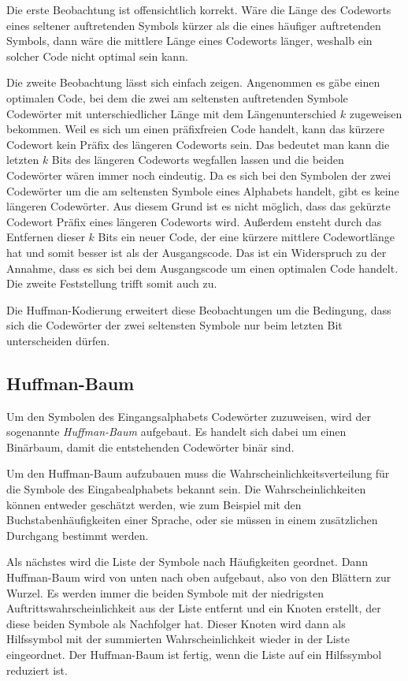 \documentclass[twoside,11pt,a4paper]{article}
\theoremstyle{break}
\begin{document}
Die erste Beobachtung ist offensichtlich korrekt. Wäre die Länge des
Codeworts eines seltener auftretenden Symbols kürzer als die eines
häufiger auftretenden Symbols, dann wäre die mittlere Länge eines
Codeworts länger, weshalb ein solcher Code nicht optimal sein kann.

Die zweite Beobachtung lässt sich einfach zeigen. Angenommen es gäbe
einen optimalen Code, bei dem die zwei am seltensten auftretenden
Symbole Codewörter mit unterschiedlicher Länge mit dem
Längenunterschied $k$ zugeweisen bekommen. Weil es sich um einen
präfixfreien Code handelt, kann das kürzere Codewort kein Präfix des
längeren Codeworts sein. Das bedeutet man kann die letzten $k$ Bits
des längeren Codeworts wegfallen lassen und die beiden Codewörter
wären immer noch eindeutig. Da es sich bei den Symbolen der zwei
Codewörter um die am seltensten Symbole eines Alphabets handelt, gibt
es keine längeren Codewörter. Aus diesem Grund ist es nicht möglich,
dass das gekürzte Codewort Präfix eines längeren Codeworts
wird. Außerdem ensteht durch das Entfernen dieser $k$ Bits ein neuer
Code, der eine kürzere mittlere Codewortlänge hat und somit besser ist
als der Ausgangscode. Das ist ein Widerspruch zu der Annahme, dass es
sich bei dem Ausgangscode um einen optimalen Code handelt. Die zweite
Feststellung trifft somit auch zu.

Die Huffman-Kodierung erweitert diese Beobachtungen um die Bedingung,
dass sich die Codewörter der zwei seltensten Symbole nur beim letzten
Bit unterscheiden dürfen.

\subsection{Huffman-Baum} \label{sec:HTREE}
Um den Symbolen des Eingangsalphabets Codewörter zuzuweisen, wird der
sogenannte \emph{Huffman-Baum} aufgebaut. Es handelt sich dabei um
einen Binärbaum, damit die entstehenden Codewörter binär sind.

Um den Huffman-Baum aufzubauen muss die Wahrscheinlichkeitsverteilung
für die Symbole des Eingabealphabets bekannt sein. Die
Wahrscheinlichkeiten können entweder geschätzt werden, wie zum
Beispiel mit den Buchstabenhäufigkeiten einer Sprache, oder sie müssen
in einem zusätzlichen Durchgang bestimmt werden.

Als nächstes wird die Liste der Symbole nach Häufigkeiten geordnet.
Dann Huffman-Baum wird von unten nach oben aufgebaut, also von den
Blättern zur Wurzel. Es werden immer die beiden Symbole mit der
niedrigsten Auftrittswahrscheinlichkeit aus der Liste entfernt und ein
Knoten erstellt, der diese beiden Symbole als Nachfolger hat. Dieser
Knoten wird dann als Hilfssymbol mit der summierten Wahrscheinlichkeit
wieder in der Liste eingeordnet. Der Huffman-Baum ist fertig, wenn die
Liste auf ein Hilfssymbol reduziert ist.
\end{document}
